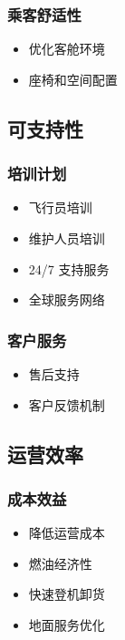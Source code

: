 \begin{multicols}{2}
  \subsubsection{乘客舒适性}
  
  \begin{itemize}
      \item 优化客舱环境
      \item 座椅和空间配置
  \end{itemize}
  
  \subsection{可支持性}
  
  \subsubsection{培训计划}
  
  \begin{itemize}
      \item 飞行员培训
      \item 维护人员培训
      \item 24/7 支持服务
      \item 全球服务网络
  \end{itemize}
  
  \subsubsection{客户服务}
  
  \begin{itemize}
      \item 售后支持
      \item 客户反馈机制
  \end{itemize}

  \subsection{运营效率}
  
  \subsubsection{成本效益}
  
  \begin{itemize}
      \item 降低运营成本
      \item 燃油经济性
      \item 快速登机卸货
      \item 地面服务优化
  \end{itemize}
  

\end{multicols}
